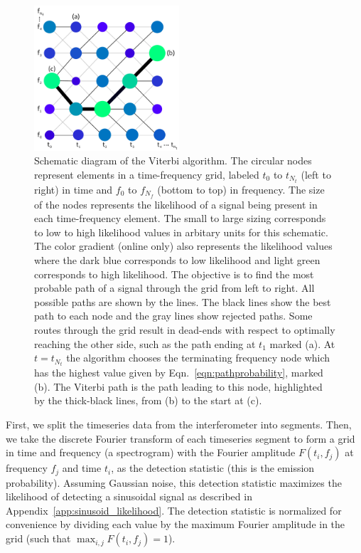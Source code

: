 \documentclass[paper-main.tex]{subfiles}
\begin{document}
\begin{figure}
\begin{center}
\includegraphics[width=0.48\textwidth]{figures/viterbiDiagramSizes.pdf}
\caption{\label{fig:viterbi}
Schematic diagram of the Viterbi algorithm. 
The circular nodes represent elements in a time-frequency grid, labeled $t_0$ to $t_{N_t}$ (left to right) in time and $f_0$ to $f_{N_f}$ (bottom to top) in frequency. 
The size of the nodes represents the likelihood of a signal being present in each time-frequency element. 
The small to large sizing corresponds to low to high likelihood values in arbitary units for this schematic. 
The color gradient (online only) also represents the likelihood values where the dark blue corresponds to low likelihood and light green corresponds to high likelihood. 
The objective is to find the most probable path of a signal through the grid from left to right.
All possible paths are shown by the lines. 
The black lines show the best path to each node and the gray lines show rejected paths. 
Some routes through the grid result in dead-ends with respect to optimally reaching the other side, such as the path ending at $t_1$ marked (a).
At $t=t_{N_t}$ the algorithm chooses the terminating frequency node which has the highest value given by Eqn.~\ref{eqn:pathprobability}, marked (b). 
The Viterbi path is the path leading to this node, highlighted by the thick-black lines, from (b) to the start at (c). 
}
\end{center}
\end{figure}




First, we split the timeseries data from the interferometer into segments. 
Then, we take the discrete Fourier transform of each timeseries segment to form a grid in time and frequency (a spectrogram) with the Fourier amplitude $F(t_i,f_j)$ at frequency $f_j$ and time $t_i$, as the detection statistic (this is the emission probability).
Assuming Gaussian noise, this detection statistic maximizes the likelihood of detecting a sinusoidal signal as described in Appendix~\ref{app:sinusoid_likelihood}.
The detection statistic is normalized for convenience by dividing each value by the maximum Fourier amplitude in the grid (such that $\max_{i,j} F(t_i,f_j) = 1$).
\end{document}
